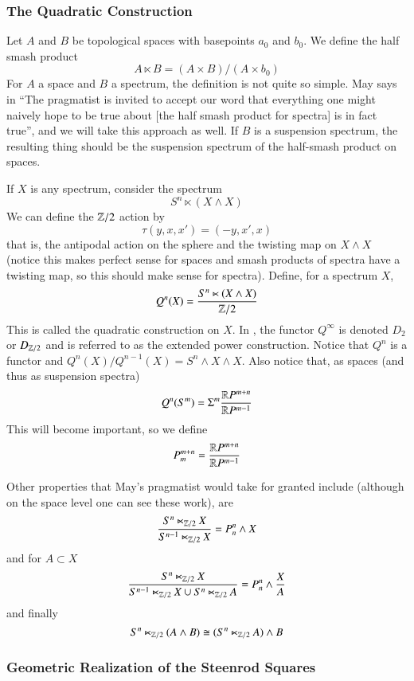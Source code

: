 \subsubsection{The Quadratic Construction}

\label{sec:quadConst}

Let $A$ and $B$ be topological spaces with basepoints $a_0$ and $b_0$.  
We define the half smash product
\[A\ltimes B = (A\times B)/(A\times b_0)\]
For $A$ a space and $B$ a spectrum, the definition is not quite so simple.  May says in \cite{H00RingSpectra} ``The pragmatist is invited to accept our word that everything one might naively hope to be true about [the half smash product for spectra] is in fact true'', and we will take this approach as well.  If $B$ is a suspension spectrum, the resulting thing should be the suspension spectrum of the half-smash product on spaces.  

If $X$ is any spectrum, consider the spectrum
\[S^n\ltimes (X\wedge X)\]
We can define the $\mathbb{Z}/2$ action by 
\[\tau(y,x,x')=(-y,x',x)\]
that is, the antipodal action on the sphere and the twisting map on $X\wedge X$ (notice this makes perfect sense for spaces and smash products of spectra have a twisting map, so this should make sense for spectra).  Define, for a spectrum $X$,
\[Q^n(X) = \frac{S^n\ltimes (X\wedge X)}{\mathbb{Z}/2}\]
This is called the quadratic construction on $X$.  
In \cite{H00RingSpectra}, the functor $Q^\infty$ is denoted $D_2$ or $D_{\mathbb{Z}/2}$ and is referred to as the extended power construction.  Notice that $Q^n$ is a functor and $Q^n(X)/Q^{n-1}(X)=S^n\wedge X\wedge X$. 
Also notice that, as spaces (and thus as suspension spectra)
\[Q^n(S^m) = \Sigma^m\frac{\mathbb{R} P^{m+n}}{\mathbb{R} P^{m-1}}\]
This will become important, so we define
\[P_m^{m+n} = \frac{\mathbb{R} P^{m+n}}{\mathbb{R} P^{m-1}}\]



Other properties that May's pragmatist would take for granted include (although on the space level one can see these work), are
\[\frac{S^n\ltimes_{\mathbb{Z}/2} X}{S^{n-1}\ltimes_{\mathbb{Z}/2} X} = P^{n}_n\wedge X\]
and for $A\subset X$
\[\frac{S^n\ltimes_{\mathbb{Z}/2} X}{S^{n-1}\ltimes_{\mathbb{Z}/2} X\cup S^{n}\ltimes_{\mathbb{Z}/2} A}= P_n^n\wedge \frac{X}{A}\]
and finally
\[S^n\ltimes_{\mathbb{Z}/2}(A\wedge B)\cong (S^n\ltimes_{\mathbb{Z}/2}A)\wedge B\]


\subsubsection{Geometric Realization of the Steenrod Squares}

